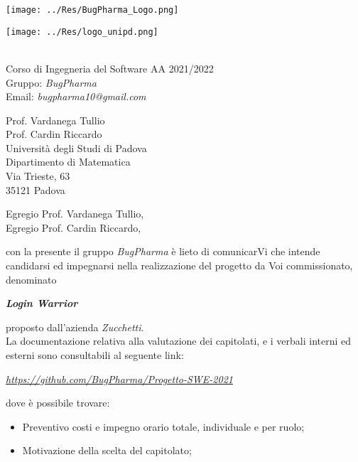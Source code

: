 \documentclass[11pt]{letter}
\date{17 Novembre 2021}
\begin{document}
	\begin{letter}{}	
		\begin{minipage}{0.5\textwidth}
			\texttt{[image: ../Res/BugPharma\_Logo.png]}
		\end{minipage}
		\begin{minipage}{0.5\textwidth}
			\texttt{[image: ../Res/logo\_unipd.png]}
		\end{minipage}
		\vspace{0.5cm}
		\\
		Corso di Ingegneria del Software AA 2021/2022 \\
		Gruppo: \textit{BugPharma} \\
		Email:\textit{ bugpharma10@gmail.com} \\
		\begin{flushright}
			Prof. Vardanega Tullio \\ 
			Prof. Cardin Riccardo \\ 
			Università degli Studi di Padova \\
			Dipartimento di Matematica \\ 
			Via Trieste, 63 \\ 
			35121 Padova
		\end{flushright}
		\opening{Egregio Prof. Vardanega Tullio,\\ Egregio Prof. Cardin Riccardo,}
		con la presente il gruppo \textit{BugPharma} è lieto di comunicarVi che intende candidarsi ed impegnarsi nella realizzazione
		del progetto da Voi commissionato, denominato \\
		\begin{center}
			\textit{\textbf{Login Warrior}}
		\end{center}
		proposto dall'azienda \textit{Zucchetti}. \\
		La documentazione relativa alla valutazione dei capitolati, e i verbali interni ed esterni sono consultabili al seguente link: \\
		\begin{center}
			\textit{\href{https://github.com/BugPharma/Progetto-SWE-2021}{{https://github.com/BugPharma/Progetto-SWE-2021}}} \\
		\end{center}
		dove è possibile trovare:
		\begin{itemize}
			\item Preventivo costi e impegno orario totale, individuale e per ruolo;
			\item Motivazione della scelta del capitolato;

\end{itemize}
\end{letter}
\end{document}

